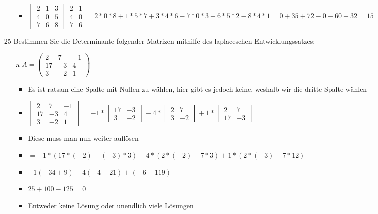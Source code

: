 \documentclass{article}
\begin{document}
\begin{itemize}
\begin{itemize}
			\begin{itemize}
				\item{$\begin{vmatrix} 2 & 1 & 3 \\ 4 & 0 & 5 \\ 7 & 6 & 8 \end{vmatrix}\begin{matrix} 2 & 1 \\ 4 & 0 \\ 7 & 6 \end{matrix}=2*0*8+1*5*7+3*4*6-7*0*3-6*5*2-8*4*1=0+35+72-0-60-32=15$}
			\end{itemize}
		\end{itemize}
		\item[25]{Bestimmen Sie die Determinante folgender Matrizen mithilfe des laplaceschen Entwicklungssatzes:}
		\begin{itemize}
			\item[a]{$A=\begin{pmatrix} 2 & 7 & -1 \\ 17 & -3 & 4 \\ 3 & -2 & 1 \end{pmatrix}$}
			\begin{itemize}
				\item{Es ist ratsam eine Spalte mit Nullen zu wählen, hier gibt es jedoch keine, weshalb wir die dritte Spalte wählen}
				\item{$\begin{vmatrix} 2 & 7 & -1\\ 17 & -3 & 4 \\ 3 & -2 & 1 \end{vmatrix}=-1*\begin{vmatrix} 17 & -3 \\ 3 & -2 \end{vmatrix}-4*\begin{vmatrix} 2 & 7 \\ 3 & -2 \end{vmatrix}+1*\begin{vmatrix} 2 & 7 \\ 17 & -3 \end{vmatrix}$}
				\item{Diese muss man nun weiter auflösen}
				\item{$=-1*(17*(-2)-(-3)*3)-4*(2*(-2)-7*3)+1*(2*(-3)-7*12)$}
				\item{$-1(-34+9)-4(-4-21)+(-6-119)$}
				\item{$25+100-125=0$}
				\item{Entweder keine Lösung oder unendlich viele Lösungen}

\end{itemize}
\end{itemize}
\end{itemize}
\end{document}
